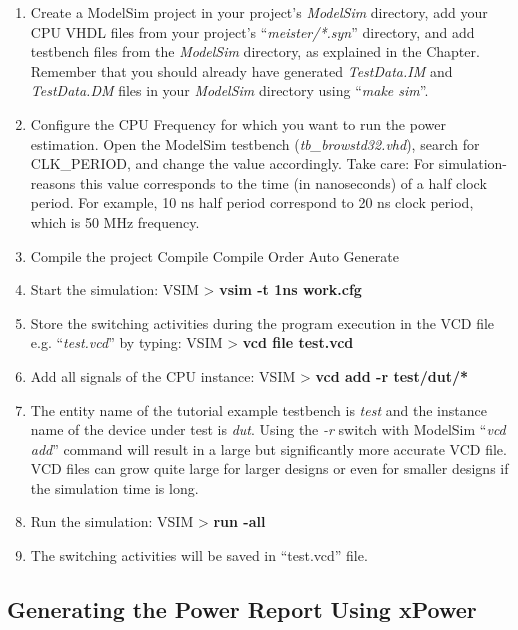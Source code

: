 \begin{enumerate}
\def\labelenumi{(\arabic{enumi})}
\item
  Create a ModelSim project in your project's \emph{ModelSim} directory,
  add your CPU VHDL files from your project's ``\emph{meister/*.syn}''
  directory, and add testbench files from the \emph{ModelSim} directory,
  as explained in the Chapter. Remember that you should already have
  generated \emph{TestData.IM} and \emph{TestData.DM} files in your
  \emph{ModelSim} directory using ``\emph{make sim}''.
\item
  Configure the CPU Frequency for which you want to run the power
  estimation. Open the ModelSim testbench (\emph{tb\_browstd32.vhd}),
  search for CLK\_PERIOD, and change the value accordingly. Take care:
  For simulation-reasons this value corresponds to the time (in
  nanoseconds) of a half clock period. For example, 10 ns half period
  correspond to 20 ns clock period, which is 50 MHz frequency.
\item
  Compile the project Compile Compile Order Auto Generate
\item
  Start the simulation: VSIM \textgreater{} \textbf{vsim -t 1ns
  work.cfg}
\item
  Store the switching activities during the program execution in the VCD
  file e.g. ``\emph{test.vcd}'' by typing: VSIM \textgreater{}
  \textbf{vcd file test.vcd}
\item
  Add all signals of the CPU instance: VSIM \textgreater{} \textbf{vcd
  add -r test/dut/*}
\item
  The entity name of the tutorial example testbench is \emph{test} and
  the instance name of the device under test is \emph{dut}. Using the
  \emph{-r} switch with ModelSim ``\emph{vcd add}'' command will result
  in a large but significantly more accurate VCD file. VCD files can
  grow quite large for larger designs or even for smaller designs if the
  simulation time is long.
\item
  Run the simulation: VSIM \textgreater{} \textbf{run -all}
\item
  The switching activities will be saved in ``test.vcd'' file.
\end{enumerate}

\hypertarget{generating-the-power-report-using-xpower}{%
\subsection{Generating the Power Report Using
xPower}\label{generating-the-power-report-using-xpower}}

